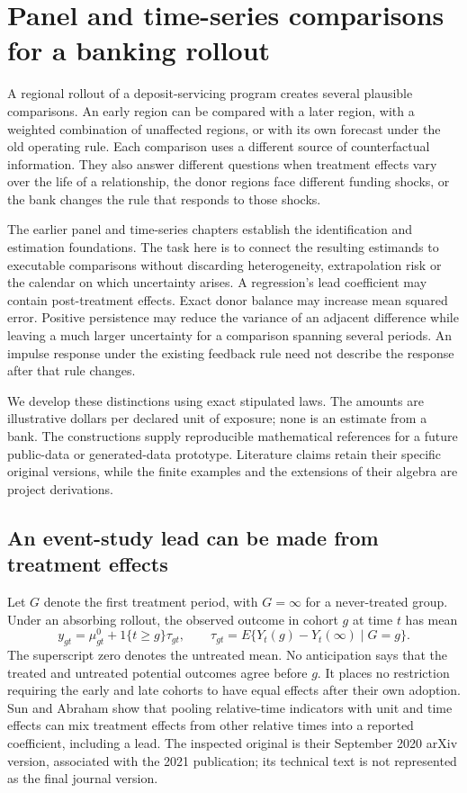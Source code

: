 \chapter{Panel and time-series comparisons for a banking rollout}
\label{exec17:s6}

A regional rollout of a deposit-servicing program creates several plausible
comparisons. An early region can be compared with a later region, with a
weighted combination of unaffected regions, or with its own forecast under the
old operating rule. Each comparison uses a different source of counterfactual
information. They also answer different questions when treatment effects
vary over the life of a relationship, the donor regions face different funding
shocks, or the bank changes the rule that responds to those shocks.

The earlier panel and time-series chapters establish the identification and
estimation foundations. The task here is to connect the resulting estimands
to executable comparisons without discarding heterogeneity, extrapolation risk
or the calendar on which uncertainty arises. A regression's lead coefficient
may contain post-treatment effects. Exact donor balance may increase mean
squared error. Positive persistence may reduce the variance of an adjacent
difference while leaving a much larger uncertainty for a comparison spanning
several periods. An impulse response under the existing feedback rule need
not describe the response after that rule changes.

We develop these distinctions using exact stipulated laws. The amounts are
illustrative dollars per declared unit of exposure; none is an estimate from
a bank. The constructions supply reproducible mathematical references for a
future public-data or generated-data prototype. Literature claims retain their
specific original versions, while the finite examples and the extensions of
their algebra are project derivations.~\citep{exec17_s6_math}

\section{An event-study lead can be made from treatment effects}
\label{exec17:s6-event}

Let $G$ denote the first treatment period, with $G=\infty$ for a never-treated
group. Under an absorbing rollout, the observed outcome in cohort $g$ at time
$t$ has mean
\begin{equation}
 y_{gt}=\mu_{gt}^{0}+1\{t\geq g\}\tau_{gt},
 \qquad \tau_{gt}=E\{Y_t(g)-Y_t(\infty)\mid G=g\}.
 \label{exec17:s6-cohort-law}
\end{equation}
The superscript zero denotes the untreated mean. No anticipation says that
the treated and untreated potential outcomes agree before $g$. It places no
restriction requiring the early and late cohorts to have equal effects after
their own adoption. Sun and Abraham show that pooling relative-time
indicators with unit and time effects can mix treatment effects from other
relative times into a reported coefficient, including a lead. The inspected
original is their September 2020 arXiv version, associated with the 2021
publication; its technical text is not represented as the final journal
version.~\citep{sun2021}

